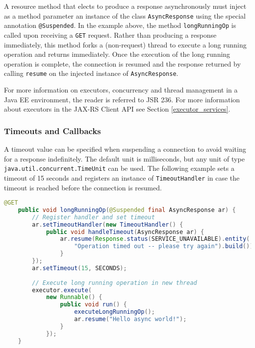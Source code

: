 \textcolor{highlight green}{A resource method that elects to produce a response asynchronously must inject as a method parameter an instance of the
class \lstinline{AsyncResponse} using the special annotation \lstinline{@Suspended}}. In the example above, the method
\lstinline{longRunningOp} is called upon receiving a \lstinline{GET} request. Rather than producing a response
immediately, this method forks a (non-request) thread to execute a long running operation and returns immediately. Once
the execution of the long running operation is complete, the connection is resumed and the response returned by calling
\lstinline{resume} on the injected instance of \lstinline{AsyncResponse}.

For more information on executors, concurrency and thread management in a Java EE environment, the reader is referred to
JSR 236. For more information about executors in the JAX-RS Client API see Section \ref{executor_services}.

\subsubsection{Timeouts and Callbacks}
\label{timeouts_and_callbacks}

A timeout value can be specified when suspending a connection to avoid waiting for a response indefinitely. The default
unit is milliseconds, but any unit of type \lstinline{java.util.concurrent.TimeUnit} can be used. The following example
sets a timeout of 15 seconds and registers an instance of \lstinline{TimeoutHandler} in case the timeout is reached
before the connection is resumed.

\begin{lstlisting}[language=Java]
    @GET
    public void longRunningOp(@Suspended final AsyncResponse ar) {
        // Register handler and set timeout
        ar.setTimeoutHandler(new TimeoutHandler() {
            public void handleTimeout(AsyncResponse ar) {
                ar.resume(Response.status(SERVICE_UNAVAILABLE).entity(
                    "Operation timed out -- please try again").build());                    
                }
        });
        ar.setTimeout(15, SECONDS);
        
        // Execute long running operation in new thread
        executor.execute(
            new Runnable() {
                public void run() {
                    executeLongRunningOp();
                    ar.resume("Hello async world!");
                } 
            });
    }
\end{lstlisting}

